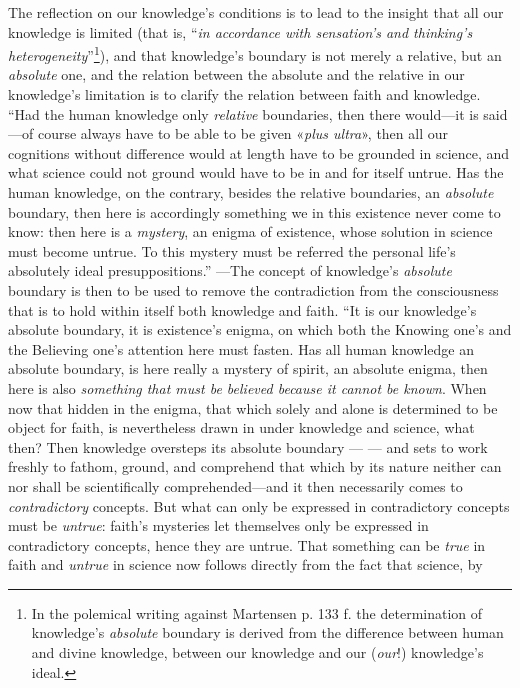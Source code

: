 \documentclass[12pt,a4paper]{book}
\begin{document}
The reflection on our knowledge's conditions is to lead to the insight that all our knowledge is
limited (that is, ``\emph{in accordance with sensation's and thinking's
heterogeneity}''\footnote{In the polemical writing against Martensen p. 133 f. the determination
of knowledge's \emph{absolute} boundary is derived from the difference between human and divine
knowledge, between our knowledge and our (\emph{our}!) knowledge's ideal.}), and that knowledge's
boundary is not merely a relative, but an \emph{absolute} one, and the relation between the
absolute and the relative in our knowledge's limitation is to clarify the relation between faith
and knowledge. ``Had the human knowledge only \emph{relative} boundaries, then there would---it is
said---of course always have to be able to be given «\textit{plus ultra}», then all our cognitions without
difference would at length have to be grounded in science, and what science could not ground would
have to be in and for itself untrue. Has the human knowledge, on the contrary, besides the relative
boundaries, an \emph{absolute} boundary, then here is accordingly something we in this existence
never come to know: then here is a \emph{mystery}, an enigma of existence, whose solution in science must
become untrue. To this mystery must be referred the personal life's absolutely ideal
presuppositions.'' ---The concept of knowledge's \emph{absolute} boundary is then to be used to
remove the contradiction from the consciousness that is to hold within itself both knowledge and
faith. ``It is our knowledge's absolute boundary, it is existence's enigma, on which both the
Knowing one's and the Believing one's attention here must fasten. Has all human knowledge an
absolute boundary, is here really a mystery of spirit, an absolute enigma, then here is also
\emph{something that must be believed because it cannot be known}. When now that hidden in the
enigma, that which solely and alone is determined to be object for faith, is nevertheless drawn in
under knowledge and science, what then? Then knowledge oversteps its absolute boundary --- --- and
sets to work freshly to fathom, ground, and comprehend that which by its nature neither can nor
shall be scientifically comprehended---and it then necessarily comes to \emph{contradictory} concepts. But
what can only be expressed in contradictory concepts must be \emph{untrue}: faith's mysteries let
themselves only be expressed in contradictory concepts, hence they are untrue. That something can be
\emph{true} in faith and \emph{untrue} in science now follows directly from the fact that science, by
\end{document}
